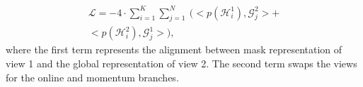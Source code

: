 \documentclass[10pt,twocolumn,letterpaper]{article}
\begin{document}
\begin{equation}
    \begin{aligned}
    \mathcal{L} = -4 \cdot \sum_{i=1}^{K} \sum_{j=1}^{N} \ ( <p(\mathcal{H}^1_i),\mathcal{G}^2_j> + \\ <p(\mathcal{H}^2_i),\mathcal{G}^1_j>) ,
    \label{eq:joint-mask}
    \end{aligned}
\end{equation}
where the first term represents the alignment between mask representation of view 1 and the global representation of view 2. The second term swaps the views for the online and momentum branches. 


\begin{table*}[t]
\centering
\caption{The performances on different downstream tasks, including linear classification (CLS), object detection (DET) and instance segmentation (SEG). }
\end{table*}
\end{document}
